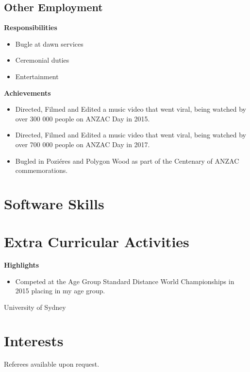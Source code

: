 \subsection{Other Employment}

{}{}
{%
\textbf{Responsibilities}
  \begin{itemize}
    \item Bugle at dawn services
    \item Ceremonial duties
    \item Entertainment
  \end{itemize}
  \textbf{Achievements}
  \begin{itemize}
    \item Directed, Filmed and Edited a music video  that went viral, being watched by over 300 000 people on ANZAC Day in 2015.
    \item Directed, Filmed and Edited a music video  that went viral, being watched by over 700 000 people on ANZAC Day in 2017.
    \item Bugled in Poziéres and Polygon Wood as part of the Centenary of ANZAC commemorations.
  \end{itemize}
}


\section{Software Skills}

\section{Extra Curricular Activities}


{%
\textbf{Highlights}
\begin{itemize}
  \item Competed at the Age Group Standard Distance World Championships in 2015 placing  in my age group.
\end{itemize}
}

{University of Sydney}
{}{}
{%
}


\section{Interests}


Referees available upon request.


